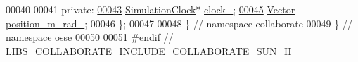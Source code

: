 \begin{DoxyCode}
00040 
00041  \textcolor{keyword}{private}:
\hyperlink{classosse_1_1collaborate_1_1_sun_af8b5c5ffc840e8cf30e62f8ea37eb82e}{00043}   \hyperlink{classosse_1_1collaborate_1_1_simulation_clock}{SimulationClock}* \hyperlink{classosse_1_1collaborate_1_1_sun_af8b5c5ffc840e8cf30e62f8ea37eb82e}{clock\_};
\hyperlink{classosse_1_1collaborate_1_1_sun_aea321687f39a904c3b35b60058a60b5b}{00045}   \hyperlink{classosse_1_1collaborate_1_1_vector}{Vector} \hyperlink{classosse_1_1collaborate_1_1_sun_aea321687f39a904c3b35b60058a60b5b}{position\_m\_rad\_};
00046 \};
00047 
00048 \}  \textcolor{comment}{// namespace collaborate}
00049 \}  \textcolor{comment}{// namespace osse}
00050 
00051 \textcolor{preprocessor}{#endif  // LIBS\_COLLABORATE\_INCLUDE\_COLLABORATE\_SUN\_H\_}
\end{DoxyCode}
